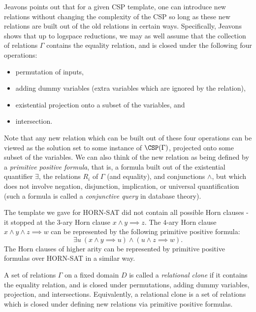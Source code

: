 Jeavons \cite{jeavons} points out that for a given CSP template, one can introduce new relations without changing the complexity of the CSP so long as these new relations are built out of the old relations in certain ways. Specifically, Jeavons shows that up to logspace reductions, we may as well assume that the collection of relations $\Gamma$ contains the equality relation, and is closed under the following four operations:
\begin{itemize}
\item permutation of inputs,

\item adding dummy variables (extra variables which are ignored by the relation),

\item existential projection onto a subset of the variables, and

\item intersection.
\end{itemize}
Note that any new relation which can be built out of these four operations can be viewed as the solution set to some instance of $\CSP(\Gamma)$, projected onto some subset of the variables. We can also think of the new relation as being defined by a \emph{primitive positive formula}, that is, a formula built out of the existential quantifier $\exists$, the relations $R_i$ of $\Gamma$ (and equality), and conjunctions $\wedge$, but which does not involve negation, disjunction, implication, or universal quantification (such a formula is called a \emph{conjunctive query} in database theory).

\begin{ex} The template we gave for HORN-SAT did not contain all possible Horn clauses - it stopped at the $3$-ary Horn clause $x\wedge y \implies z$. The $4$-ary Horn clause $x \wedge y \wedge z \implies w$ can be represented by the following primitive positive formula:
\[
\exists u\ (x \wedge y \implies u) \wedge (u \wedge z \implies w).
\]
The Horn clauses of higher arity can be represented by primitive positive formulas over HORN-SAT in a similar way.
\end{ex}

\begin{defn} A set of relations $\Gamma$ on a fixed domain $D$ is called a \emph{relational clone} if it contains the equality relation, and is closed under permutations, adding dummy variables, projection, and intersections. Equivalently, a relational clone is a set of relations which is closed under defining new relations via primitive positive formulas.
\end{defn}

